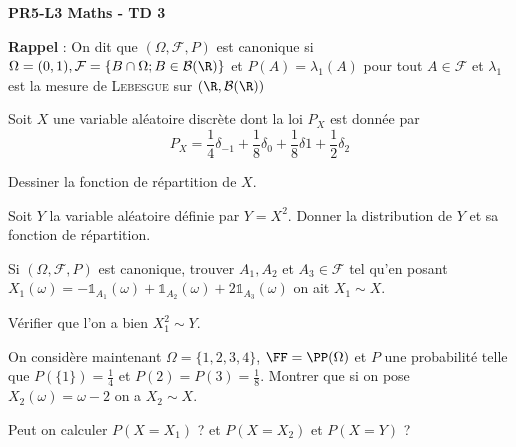 \documentclass{report}
\begin{document}
\begin{center}
    \Huge{\textbf{PR5-L3 Maths - TD 3}}
\end{center}
\bigskip

\textbf{Rappel} : On dit que \(\left( \Omega,\mathcal{F}, P\right)\) est
canonique si \(\Omega=(0,1),\mathcal{F}=\{B\cap\Omega;B\in\mathcal{B}(\R)\}
\) et \(P(A)=\lambda_1(A)\) pour tout \(A\in\mathcal{F}\) et \(\lambda_1\)
est la mesure de \textsc{Lebesgue} sur \(\left(\R,\mathcal{B}(\R)\right)\)

\begin{exo}
    Soit \(X\) une variable aléatoire discrète dont la loi \(P_X\) est
    donnée par \[P_X=\frac14\delta_{-1}+\frac18\delta_0+\frac18\delta1
    +\frac12\delta_2\]
    \begin{q}{1}
        Dessiner la fonction de répartition de \(X\).
    \end{q}
    \begin{q}{2}
        Soit \(Y\) la variable aléatoire définie par \(Y=X^2\). Donner
        la distribution de \(Y\) et sa fonction de répartition.
    \end{q}
    \begin{q}{3}
        Si \(\left(\Omega, \mathcal{F},P\right)\) est canonique, trouver
        \(A_1, A_2\) et \(A_3\in\mathcal{F}\) tel qu'en posant \(X_1(\omega)
        =-\mathds{1}_{A_1}(\omega)+\mathds{1}_{A_2}(\omega)+ 2\mathds{1}_{A_3}
        (\omega)\) on ait \(X_1\sim X\).
        \boxans{On choisit par exemple \(A_1=(0,\frac14], A_2=(\frac38,\frac12]\)
        et \(A_3=(\frac12, 1)\) donnant bien \(X_1\sim X\)}
    \end{q}
    \begin{q}{4}
        Vérifier que l'on a bien \(X_1^2\sim Y\).
    \end{q}
    \begin{q}{5}
        On considère maintenant \(\Omega=\{1,2,3,4\}\), \(\FF=\PP(\Omega)\)
        et \(P\) une probabilité telle que \(P(\{1\})=\frac14\) et
        \(P({2})=P({3})= \frac18\). Montrer que si on pose \(X_2(\omega)=\omega - 2\)
        on a \(X_2\sim X\).
    \end{q}
    \begin{q}{6}
        Peut on calculer \(P(X=X_1)\) ? et \(P(X=X_2)\) et \(P(X=Y)\) ?
    \end{q}
\end{exo}
\end{document}
